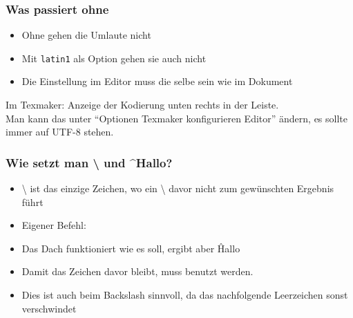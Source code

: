 \begin{loesung}
    \frametitle{Was passiert ohne }

    \begin{itemize}
        \item Ohne  gehen die Umlaute nicht
        \item Mit \texttt{latin1} als Option gehen sie auch nicht \pause
        \item[\textrightarrow] Die Einstellung im Editor muss die selbe sein wie im Dokument
    \end{itemize}
    
    \bigskip
    Im Texmaker: Anzeige der Kodierung unten rechts in der Leiste.\\
    Man kann das unter \enquote{Optionen \textrightarrow{} Texmaker konfigurieren \textrightarrow{} Editor} ändern, es sollte immer auf UTF-8 stehen.
\end{loesung}

\begin{loesung}
    \frametitle{Wie setzt man \textbackslash{} und \^{}Hallo?}
    
    \begin{itemize}
        \item \textbackslash{} ist das einzige Zeichen, wo ein \textbackslash{}
            davor nicht zum gewünschten Ergebnis führt
        \item[\textrightarrow] Eigener Befehl: \pause
        \medskip
        \item Das Dach funktioniert wie es soll, ergibt aber \^ Hallo
        \item[\textrightarrow] Damit das Zeichen davor bleibt, muss \cmd{\^{}\{\}}
            benutzt werden.\pause
        \medskip
        \item[\textrightarrow] Dies ist auch beim Backslash sinnvoll, da das
            nachfolgende Leerzeichen sonst verschwindet
    \end{itemize}
\end{loesung}